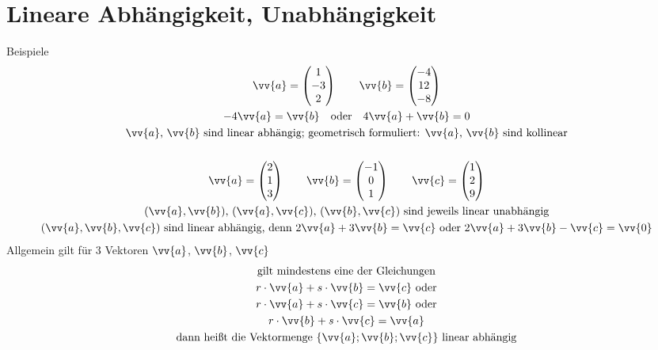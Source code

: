 \section{Lineare Abhängigkeit, Unabhängigkeit}
Beispiele
\begin{gather*}
  \vv{a} = \begin{pmatrix}1 \\ -3 \\ 2\end{pmatrix} \qquad \vv{b} = \begin{pmatrix}-4 \\ 12 \\ -8\end{pmatrix} \\
  -4\vv{a} = \vv{b} \quad\text{oder}\quad 4\vv{a} + \vv{b} = 0 \\
  \text{$\vv{a}$, $\vv{b}$ sind linear abhängig; geometrisch formuliert: $\vv{a}$, $\vv{b}$ sind kollinear} \\\\
  \vv{a} = \begin{pmatrix}2 \\ 1 \\ 3\end{pmatrix} \qquad \vv{b} = \begin{pmatrix}-1 \\ 0 \\ 1\end{pmatrix} \qquad \vv{c} = \begin{pmatrix}1 \\ 2 \\ 9\end{pmatrix} \\
  \text{$(\vv{a}, \vv{b})$, $(\vv{a}, \vv{c})$, $(\vv{b}, \vv{c})$ sind jeweils linear unabhängig} \\
  \text{$(\vv{a}, \vv{b}, \vv{c})$ sind linear abhängig, denn $2\vv{a} + 3\vv{b} = \vv{c}$ oder $2\vv{a} + 3\vv{b} - \vv{c} = \vv{0}$}
\end{gather*}
Allgemein gilt für 3 Vektoren $\vv{a}$, $\vv{b}$, $\vv{c}$
\begin{gather*}
  \text{gilt mindestens eine der Gleichungen} \\
  r \cdot \vv{a} + s \cdot \vv{b} = \vv{c} \text{ oder} \\
  r \cdot \vv{a} + s \cdot \vv{c} = \vv{b} \text{ oder} \\
  r \cdot \vv{b} + s \cdot \vv{c} = \vv{a} \\
  \text{dann heißt die Vektormenge $\left\{\vv{a}; \vv{b}; \vv{c}\right\}$ linear abhängig}
\end{gather*}
